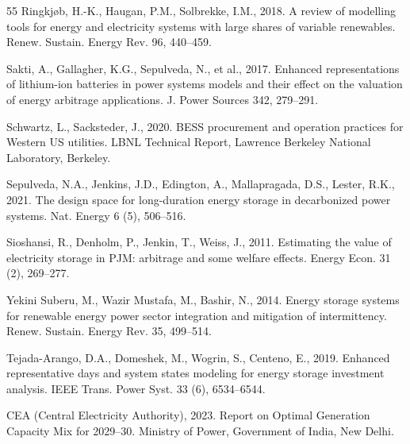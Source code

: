 \documentclass[11pt,a4paper]{article}
\begin{document}
\begin{thebibliography}{55}
Ringkj{\o}b, H.-K., Haugan, P.M., Solbrekke, I.M., 2018.
A review of modelling tools for energy and electricity systems with large shares of variable renewables.
Renew. Sustain. Energy Rev. 96, 440--459.

Sakti, A., Gallagher, K.G., Sepulveda, N., et al., 2017.
Enhanced representations of lithium-ion batteries in power systems models and their effect on the valuation of energy arbitrage applications.
J. Power Sources 342, 279--291.

Schwartz, L., Sacksteder, J., 2020.
BESS procurement and operation practices for Western US utilities.
LBNL Technical Report, Lawrence Berkeley National Laboratory, Berkeley.

Sepulveda, N.A., Jenkins, J.D., Edington, A., Mallapragada, D.S., Lester, R.K., 2021.
The design space for long-duration energy storage in decarbonized power systems.
Nat. Energy 6 (5), 506--516.

Sioshansi, R., Denholm, P., Jenkin, T., Weiss, J., 2011.
Estimating the value of electricity storage in PJM: arbitrage and some welfare effects.
Energy Econ. 31 (2), 269--277.

Yekini Suberu, M., Wazir Mustafa, M., Bashir, N., 2014.
Energy storage systems for renewable energy power sector integration and mitigation of intermittency.
Renew. Sustain. Energy Rev. 35, 499--514.

Tejada-Arango, D.A., Domeshek, M., Wogrin, S., Centeno, E., 2019.
Enhanced representative days and system states modeling for energy storage investment analysis.
IEEE Trans. Power Syst. 33 (6), 6534--6544.






CEA (Central Electricity Authority), 2023.
Report on Optimal Generation Capacity Mix for 2029--30.
Ministry of Power, Government of India, New Delhi.



\end{thebibliography}
\end{document}
